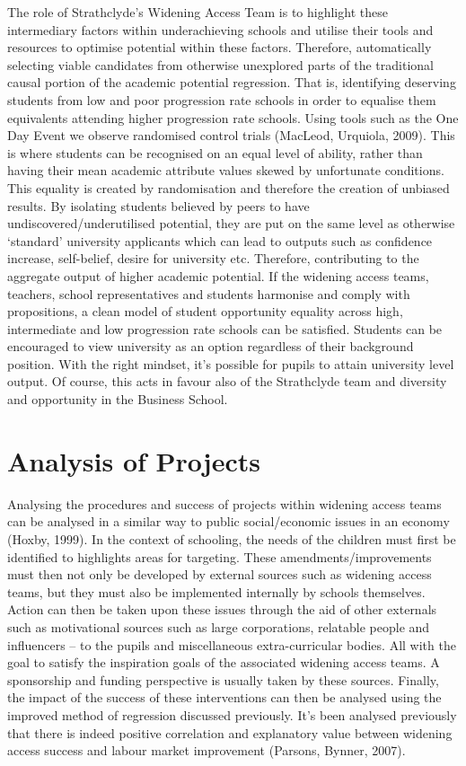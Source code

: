 \documentclass[11pt, english]{article}
\begin{document}
	The role of Strathclyde’s Widening Access Team is to highlight these intermediary factors within underachieving schools and utilise their tools and resources to optimise potential within these factors. Therefore, automatically selecting viable candidates from otherwise unexplored parts of the traditional causal portion of the academic potential regression. That is, identifying deserving students from low and poor progression rate schools in order to equalise them equivalents attending higher progression rate schools. Using tools such as the One Day Event we observe randomised control trials (MacLeod, Urquiola, 2009). This is where students can be recognised on an equal level of ability, rather than having their mean academic attribute values skewed by unfortunate conditions. This equality is created by randomisation and therefore the creation of unbiased results. By isolating students believed by peers to have undiscovered/underutilised potential, they are put on the same level as otherwise ‘standard’ university applicants which can lead to outputs such as confidence increase, self-belief, desire for university etc. Therefore, contributing to the aggregate output of higher academic potential. If the widening access teams, teachers, school representatives and students harmonise and comply with propositions, a clean model of student opportunity equality across high, intermediate and low progression rate schools can be satisfied. Students can be encouraged to view university as an option regardless of their background position. With the right mindset, it’s possible for pupils to attain university level output. Of course, this acts in favour also of the Strathclyde team and diversity and opportunity in the Business School.

\newpage 

\section{Analysis of Projects}

	Analysing the procedures and success of projects within widening access teams can be analysed in a similar way to public social/economic issues in an economy (Hoxby, 1999). In the context of schooling, the needs of the children must first be identified to highlights areas for targeting. These amendments/improvements must then not only be developed by external sources such as widening access teams, but they must also be implemented internally by schools themselves. Action can then be taken upon these issues through the aid of other externals such as motivational sources such as large corporations, relatable people and influencers – to the pupils and miscellaneous extra-curricular bodies. All with the goal to satisfy the inspiration goals of the associated widening access teams. A sponsorship and funding perspective is usually taken by these sources. Finally, the impact of the success of these interventions can then be analysed using the improved method of regression discussed previously. It’s been analysed previously that there is indeed positive correlation and explanatory value between widening access success and labour market improvement (Parsons, Bynner, 2007).
\end{document}
